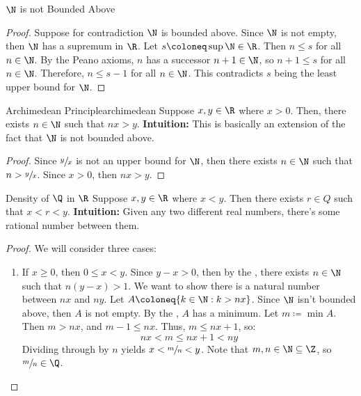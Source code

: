 \begin{thmbox}{$\N$ is not Bounded Above}{}
    \begin{proof}
        Suppose for contradiction $\N$ is bounded above. Since $\N$ is not empty, then $\N$ has a supremum in $\R$. Let $s \coloneq \sup \N \in \R$. Then $n \leq s$ for all $n \in \N$. By the Peano axioms, $n$ has a successor $n+1 \in \N$, so $n+1 \leq s$ for all $n \in \N$. Therefore, $n \leq s - 1$ for all $n \in \N$. This contradicts $s$ being the least upper bound for $\N$.
    \end{proof}
\end{thmbox}

\begin{thmbox}{Archimedean Principle}{archimedean}
    Suppose $x,y \in \R$ where $x > 0$. Then, there exists $n \in \N$ such that $nx > y$.
    \tcblower
    \textbf{Intuition:} This is basically an extension of the fact that $\N$ is not bounded above.
    \begin{proof}
        Since $\sfrac{y}{x}$ is not an upper bound for $\N$, then there exists $n \in \N$ such that $n > \sfrac{y}{x}$. Since $x > 0$, then $nx > y$.
    \end{proof}
\end{thmbox}

\begin{thmbox}{Density of $\Q$ in $\R$}{}
    Suppose $x,y \in \R$ where $x < y$. Then there exists $r \in Q$ such that $x < r < y$.
    \tcblower
    \textbf{Intuition:} Given any two different real numbers, there's some rational number between them.
    \begin{proof}
        We will consider three cases:
        \begin{enumerate}
            \item If $x \geq 0$, then $0 \leq x < y$. Since $y - x > 0$, then by the , there exists $n \in \N$ such that $n(y-x) > 1$. We want to show there is a natural number between $nx$ and $ny$. Let $A \coloneq \{ k \in \N : k > nx \}$. Since $\N$ isn't bounded above, then $A$ is not empty. By the , $A$ has a minimum. Let $m \coloneq \min A$. Then $m > nx$, and $m-1 \leq nx$. Thus, $m \leq nx+1$, so:
            \[ nx < m \leq nx+1 < ny \]
            Dividing through by $n$ yields $x < \sfrac{m}{n} < y$. Note that $m,n \in \N \subseteq \Z$, so $\sfrac{m}{n} \in \Q$.
        \end{enumerate}
    \end{proof}
\end{thmbox}
